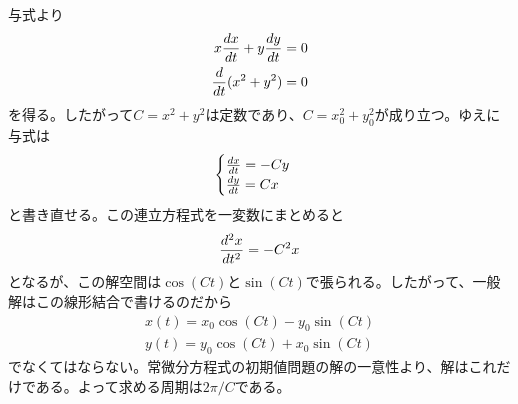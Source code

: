 \begin{sol}
与式より
\begin{align*}
  x \frac{dx}{dt} + y \frac{dy}{dt} &= 0 \\
  \frac{d}{dt}(x^2 + y^2) &= 0
\end{align*}
を得る。したがって$C = x^2 + y^2$は定数であり、$C = x_0^2 + y_0^2$が成り立つ。ゆえに与式は
\[
\begin{cases}
  \frac{dx}{dt} = - Cy \\
    \frac{dy}{dt} = Cx
\end{cases}
\]
と書き直せる。この連立方程式を一変数にまとめると
\[
\frac{d^2 x}{dt^2} = - C^2 x
\]
となるが、この解空間は$\cos (C t)$と$\sin (Ct)$で張られる。したがって、一般解はこの線形結合で書けるのだから
\begin{align*}
  x(t) = x_0 \cos(Ct) - y_0 \sin (Ct) \\
  y(t) = y_0 \cos(Ct) + x_0 \sin (Ct)
\end{align*}
でなくてはならない。常微分方程式の初期値問題の解の一意性より、解はこれだけである。よって求める周期は$2\pi / C$である。
\end{sol}




